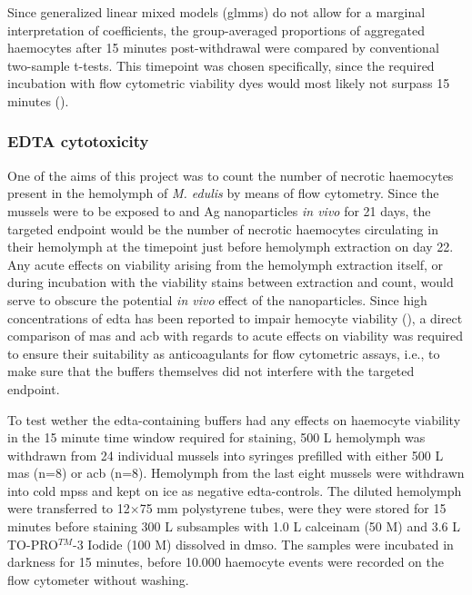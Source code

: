 Since generalized linear mixed models (\acrshort{glmms}) do not allow for a marginal interpretation of coefficients, the group-averaged proportions of aggregated haemocytes after 15 minutes post-withdrawal were compared by conventional two-sample t-tests. This timepoint was chosen specifically, since the required incubation with flow cytometric viability dyes would most likely not surpass 15 minutes (\cite{Nescerecka2016}).

\subsubsection{EDTA cytotoxicity}
One of the aims of this project was to count the number of necrotic haemocytes present in the hemolymph of \emph{M. edulis} by means of flow cytometry. Since the mussels were to be exposed to  and Ag nanoparticles \emph{in vivo} for 21 days, the targeted endpoint would be the number of necrotic haemocytes circulating in their hemolymph at the timepoint just before hemolymph extraction on day 22. Any acute effects on viability arising from the hemolymph extraction itself, or during incubation with the viability stains between extraction and count, would serve to obscure the potential \emph{in vivo} effect of the nanoparticles. Since high concentrations of \acrshort{edta} has been reported to impair hemocyte viability (\cite{Grandiosa2018, Burkhard2009}), a direct comparison of \acrshort{mas} and \acrshort{acb} with regards to acute effects on viability was required to ensure their suitability as anticoagulants for flow cytometric assays, i.e., to make sure that the buffers themselves did not interfere with the targeted endpoint. 

To test wether the \acrshort{edta}-containing buffers had any effects on haemocyte viability in the 15 minute time window required for staining, 500 \micro L hemolymph was withdrawn from 24 individual mussels into syringes prefilled with either 500 \micro L \acrshort{mas} (n=8) or \acrshort{acb} (n=8). Hemolymph from the last eight mussels were withdrawn into cold \acrshort{mpss} and kept on ice as negative \acrshort{edta}-controls. The diluted hemolymph were transferred to 12$\times$75 mm polystyrene tubes, were they were stored for 15 minutes before staining 300 \micro L subsamples with 1.0 \micro L \acrshort{calceinam} (50 \micro M) and 3.6 \micro L TO-PRO$^{TM}$-3 Iodide (100 \micro M) dissolved in \acrshort{dmso}. The samples were incubated in darkness for 15 minutes, before 10.000 haemocyte events were recorded on the flow cytometer without washing.

